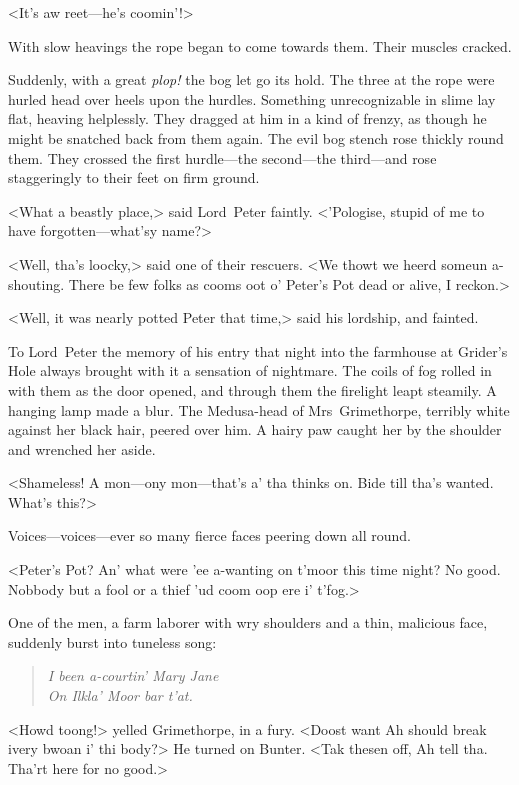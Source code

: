 <It's aw reet—he's coomin'!>

With slow heavings the rope began to come towards them. Their muscles cracked.

Suddenly, with a great \emph{plop!} the bog let go its hold. The three at the rope were hurled head over heels upon the hurdles. Something unrecognizable in slime lay flat, heaving helplessly. They dragged at him in a kind of frenzy, as though he might be snatched back from them again. The evil bog stench rose thickly round them. They crossed the first hurdle—the second—the third—and rose staggeringly to their feet on firm ground.

<What a beastly place,> said Lord~Peter faintly. <'Pologise, stupid of me to have forgotten—what'sy name?>

<Well, tha's loocky,> said one of their rescuers. <We thowt we heerd someun a-shouting. There be few folks as cooms oot o' Peter's Pot dead or alive, I reckon.>

<Well, it was nearly potted Peter that time,> said his lordship, and fainted. 

\divider

To Lord~Peter the memory of his entry that night into the farmhouse at Grider's Hole always brought with it a sensation of nightmare.  The coils of fog rolled in with them as the door opened, and through them the firelight leapt steamily. A hanging lamp made a blur. The Medusa-head of Mrs~Grimethorpe, terribly white against her black hair, peered over him. A hairy paw caught her by the shoulder and wrenched her aside.

<Shameless! A mon—ony mon—that's a' tha thinks on. Bide till tha's wanted. What's this?>

Voices—voices—ever so many fierce faces peering down all round.

<Peter's Pot? An' what were 'ee a-wanting on t'moor this time night? No good. Nobbody but a fool or a thief 'ud coom oop ere i' t'fog.>

One of the men, a farm laborer with wry shoulders and a thin, malicious face, suddenly burst into tuneless song: 

\begin{quote}\itshape
I been a-courtin' Mary Jane\\
On Ilkla' Moor bar t'at.
\end{quote}

 <Howd toong!> yelled Grimethorpe, in a fury. <Doost want Ah should break ivery bwoan i' thi body?> He turned on Bunter. <Tak thesen off, Ah tell tha. Tha'rt here for no good.>

